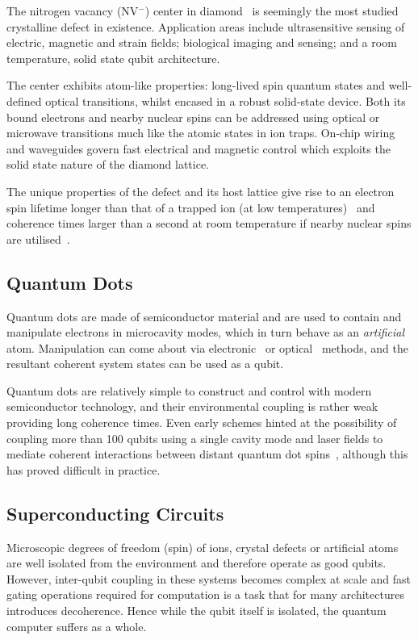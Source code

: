 The nitrogen vacancy (NV$^-$) center in diamond~\cite{Gruber1997} is seemingly the most studied crystalline defect in existence.
Application areas include ultrasensitive sensing of electric, magnetic and strain fields; biological imaging and sensing; and a room temperature, solid state qubit architecture.

The center exhibits atom-like properties: long-lived spin quantum states and well-defined optical transitions, whilst encased in a robust solid-state device.
Both its bound electrons and nearby nuclear spins can be addressed using optical or microwave transitions much like the atomic states in ion traps.
On-chip wiring and waveguides govern fast electrical and magnetic control which exploits the solid state nature of the diamond lattice.

The unique properties of the defect and its host lattice give rise to an electron spin lifetime longer than that of a trapped ion (at low temperatures)~\cite{Jarmola2012} and coherence times larger than a second at room temperature if nearby nuclear spins are utilised~\cite{Maurer2012}.

\subsection{Quantum Dots}
Quantum dots are made of semiconductor material and are used to contain and manipulate electrons in microcavity modes, which in turn behave as an \textit{artificial} atom.
Manipulation can come about via electronic~\cite{Chang1974} or optical~\cite{Dingle1974} methods, and the resultant coherent system states can be used as a qubit.

Quantum dots are relatively simple to construct and control with modern semiconductor technology, and their environmental coupling is rather weak providing long coherence times.
Even early schemes hinted at the possibility of coupling more than 100 qubits using a single cavity mode and laser fields to mediate coherent interactions between distant quantum dot spins~\cite{Imamoglu1999}, although this has proved difficult in practice.

\subsection{Superconducting Circuits}\label{sec:sccircuits}

Microscopic degrees of freedom (\eg spin) of ions, crystal defects or artificial atoms are well isolated from the environment and therefore operate as good qubits.
However, inter-qubit coupling in these systems becomes complex at scale and fast gating operations required for computation is a task that for many architectures introduces decoherence.
Hence while the qubit itself is isolated, the quantum computer suffers as a whole.

